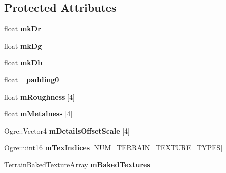 \subsection*{Protected Attributes}
\begin{DoxyCompactItemize}
\item 
\mbox{\label{class_hlms_terrain_datablock_a9899754d640e38f1d0a169ee785ecf13}} 
float {\bfseries mk\+Dr}
\item 
\mbox{\label{class_hlms_terrain_datablock_a6ed4b5464a8f78020816c11d666e82ed}} 
float {\bfseries mk\+Dg}
\item 
\mbox{\label{class_hlms_terrain_datablock_ab5865a79503da4fc88243294fd1c6efd}} 
float {\bfseries mk\+Db}
\item 
\mbox{\label{class_hlms_terrain_datablock_a09784dfaf2db83084497135642f2712a}} 
float {\bfseries \+\_\+padding0}
\item 
\mbox{\label{class_hlms_terrain_datablock_a71460eab8386a86ddf309bcf0d2d63a4}} 
float {\bfseries m\+Roughness} \mbox{[}4\mbox{]}
\item 
\mbox{\label{class_hlms_terrain_datablock_adbdc33d9934bef8d0c98979521e37227}} 
float {\bfseries m\+Metalness} \mbox{[}4\mbox{]}
\item 
\mbox{\label{class_hlms_terrain_datablock_a6b678509251519e2d56c6634b14db9c4}} 
Ogre\+::\+Vector4 {\bfseries m\+Details\+Offset\+Scale} \mbox{[}4\mbox{]}
\item 
\mbox{\label{class_hlms_terrain_datablock_a6d3d2fda15c11659fb396490e05d3b4a}} 
Ogre\+::uint16 {\bfseries m\+Tex\+Indices} \mbox{[}N\+U\+M\+\_\+\+T\+E\+R\+R\+A\+I\+N\+\_\+\+T\+E\+X\+T\+U\+R\+E\+\_\+\+T\+Y\+P\+ES\mbox{]}
\item 
\mbox{\label{class_hlms_terrain_datablock_a2b7248de99eb1d55a2889a286bb1a6c1}} 
Terrain\+Baked\+Texture\+Array {\bfseries m\+Baked\+Textures}
\item 

\end{DoxyCompactItemize}
